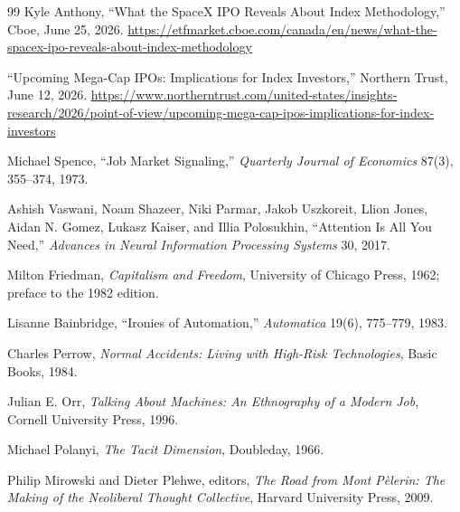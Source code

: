 \documentclass[12pt]{article}
\begin{document}
\begin{thebibliography}{99}
 Kyle Anthony, ``What the SpaceX IPO Reveals About Index Methodology,'' Cboe, June 25, 2026. \url{https://etfmarket.cboe.com/canada/en/news/what-the-spacex-ipo-reveals-about-index-methodology}

 ``Upcoming Mega-Cap IPOs: Implications for Index Investors,'' Northern Trust, June 12, 2026. \url{https://www.northerntrust.com/united-states/insights-research/2026/point-of-view/upcoming-mega-cap-ipos-implications-for-index-investors}

 Michael Spence, ``Job Market Signaling,'' \emph{Quarterly Journal of Economics} 87(3), 355--374, 1973.

 Ashish Vaswani, Noam Shazeer, Niki Parmar, Jakob Uszkoreit, Llion Jones, Aidan N. Gomez, Lukasz Kaiser, and Illia Polosukhin, ``Attention Is All You Need,'' \emph{Advances in Neural Information Processing Systems} 30, 2017.

 Milton Friedman, \emph{Capitalism and Freedom}, University of Chicago Press, 1962; preface to the 1982 edition.

 Lisanne Bainbridge, ``Ironies of Automation,'' \emph{Automatica} 19(6), 775--779, 1983.

 Charles Perrow, \emph{Normal Accidents: Living with High-Risk Technologies}, Basic Books, 1984.

 Julian E. Orr, \emph{Talking About Machines: An Ethnography of a Modern Job}, Cornell University Press, 1996.

 Michael Polanyi, \emph{The Tacit Dimension}, Doubleday, 1966.

 Philip Mirowski and Dieter Plehwe, editors, \emph{The Road from Mont P\`elerin: The Making of the Neoliberal Thought Collective}, Harvard University Press, 2009.

\end{thebibliography}
\end{document}
